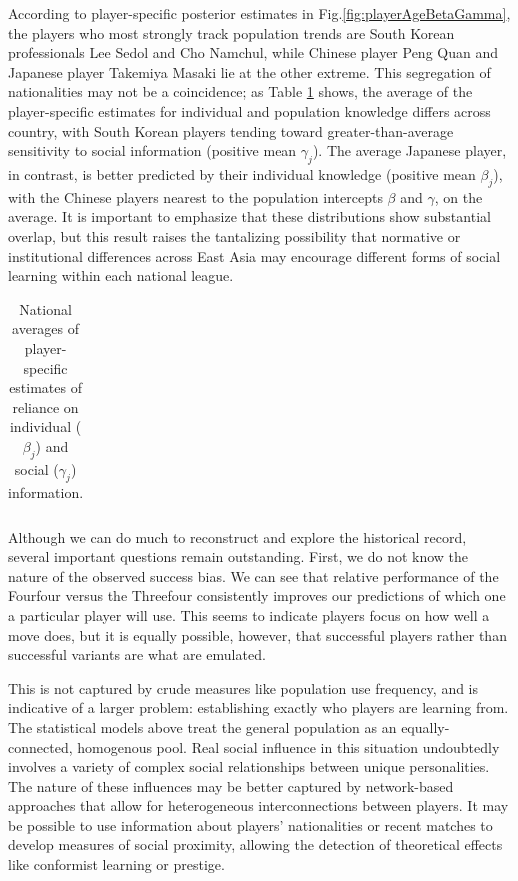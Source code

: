 \documentclass[12pt]{article}
\begin{document}
According to player-specific posterior estimates in Fig.\;\ref{fig:playerAgeBetaGamma}, the players who most strongly track population trends are South Korean professionals Lee Sedol and Cho Namchul, while Chinese player Peng Quan and Japanese player Takemiya Masaki lie at the other extreme. This segregation of nationalities may not be a coincidence; as Table \ref{table:national_coef_averages} shows, the average of the player-specific estimates for individual and population knowledge differs across country, with South Korean players tending toward greater-than-average sensitivity to social information (positive mean $\gamma_j$). The average Japanese player, in contrast, is better predicted by their individual knowledge (positive mean $\beta_j$), with the \nChinesePlayers{} Chinese players nearest to the population intercepts $\beta$ and $\gamma$, on the average. It is important to emphasize that these distributions show substantial overlap, but this result raises the tantalizing possibility that normative or institutional differences across East Asia may encourage different forms of social learning within each national league.

\begin{table}[t]
  \centering
    \begin{tabular}{lrrrrr}
    
    \end{tabular}
    \caption{National averages of player-specific estimates of reliance on individual ($\beta_j$) and social ($\gamma_j$) information.}
    \label{table:national_coef_averages}
\end{table}

Although we can do much to reconstruct and explore the historical record, several important questions remain outstanding. First, we do not know the nature of the observed success bias. We can see that relative performance of the Fourfour versus the Threefour consistently improves our predictions of which one a particular player will use. This seems to indicate players focus on how well a move does, but it is equally possible, however, that successful players rather than successful variants are what are emulated.

This is not captured by crude measures like population use frequency, and is indicative of a larger problem: establishing exactly who players are learning from. The statistical models above treat the general population as an equally-connected, homogenous pool. Real social influence in this situation undoubtedly involves a variety of complex social relationships between unique personalities. The nature of these influences may be better captured by network-based approaches that allow for heterogeneous interconnections between players. It may be possible to use information about players' nationalities or recent matches to develop measures of social proximity, allowing the detection of theoretical effects like conformist learning or prestige.
\end{document}
